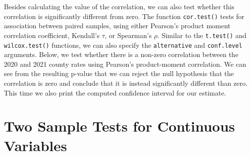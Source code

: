 \documentclass[
  letterpaper,
]{krantz}
\makeatletter
\newenvironment{Shaded}{\begin{snugshade}}{\end{snugshade}}
\newcommand{\AttributeTok}[1]{\textcolor[rgb]{0.40,0.45,0.13}{#1}}
\newcommand{\CommentTok}[1]{\textcolor[rgb]{0.37,0.37,0.37}{#1}}
\newcommand{\FunctionTok}[1]{\textcolor[rgb]{0.28,0.35,0.67}{#1}}
\newcommand{\NormalTok}[1]{\textcolor[rgb]{0.00,0.23,0.31}{#1}}
\newcommand{\OtherTok}[1]{\textcolor[rgb]{0.00,0.23,0.31}{#1}}
\newcommand{\SpecialCharTok}[1]{\textcolor[rgb]{0.37,0.37,0.37}{#1}}
\newcommand{\StringTok}[1]{\textcolor[rgb]{0.13,0.47,0.30}{#1}}
\newenvironment{kframe}{%
\medskip{}
\setlength{\fboxsep}{.8em}
 \def\at@end@of@kframe{}%
 \ifinner\ifhmode%
  \def\at@end@of@kframe{\end{minipage}}%
  \begin{minipage}{\columnwidth}%
 \fi\fi%
 \def\FrameCommand##1{\hskip\@totalleftmargin \hskip-\fboxsep
 \colorbox{shadecolor}{##1}\hskip-\fboxsep
     \hskip-\linewidth \hskip-\@totalleftmargin \hskip\columnwidth}%
 \MakeFramed {\advance\hsize-\width
   \@totalleftmargin\z@ \linewidth\hsize
   \@setminipage}}%
 {\par\unskip\endMakeFramed%
 \at@end@of@kframe}
\renewenvironment{Shaded}{\begin{kframe}}{\end{kframe}}
\makeatother
\begin{document}
Besides calculating the value of the correlation, we can also test
whether this correlation is significantly different from zero. The
function \texttt{cor.test()} tests for association between paired
samples, using either Pearson's product moment correlation coefficient,
Kendall's \(\tau\), or Spearman's \(\rho\). Similar to the
\texttt{t.test()} and \texttt{wilcox.test()} functions, we can also
specify the \texttt{alternative} and \texttt{conf.level} arguments.
Below, we test whether there is a non-zero correlation between the 2020
and 2021 county rates using Pearson's product-moment correlation. We can
see from the resulting p-value that we can reject the null hypothesis
that the correlation is zero and conclude that it is instead
significantly different than zero. This time we also print the computed
confidence interval for our estimate.

\begin{Shaded}
\end{Shaded}

\begin{Shaded}
\end{Shaded}

\hypertarget{two-sample-tests-for-continuous-variables}{%
\section{Two Sample Tests for Continuous
Variables}\label{two-sample-tests-for-continuous-variables}}
\end{document}
